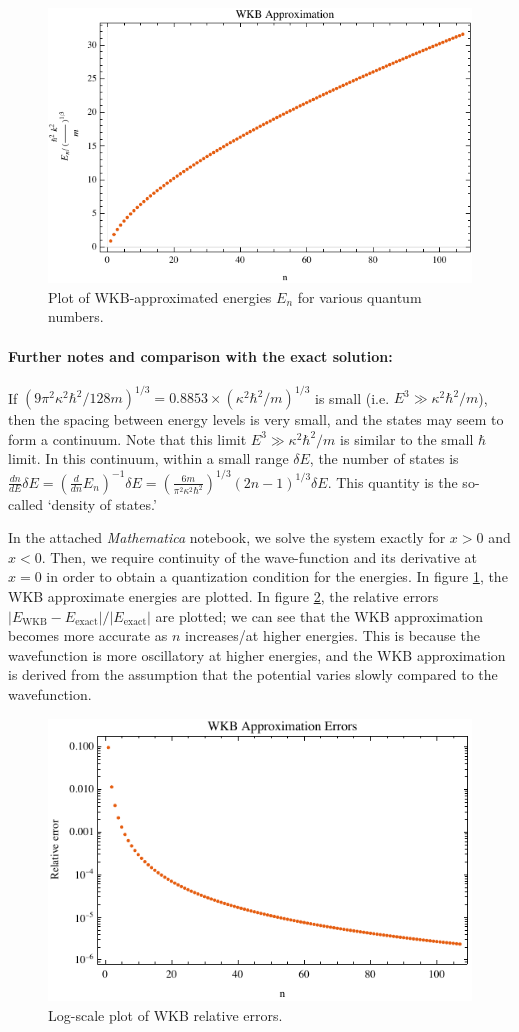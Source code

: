 \documentclass[10pt]{article}
\newcommand{\1}{\mathbf 1}
\begin{document}
\begin{figure}[h!]
	\centering
	\includegraphics[width=0.7\linewidth]{fig/WKBenergies.pdf}
	\caption{\label{WKBenergies}
		Plot of WKB-approximated energies $E_n$ for various quantum numbers.
	}
\end{figure}

\paragraph{Further notes and comparison with the exact solution:}

If $\left(9 \pi^2 \kappa^2 \hbar^2 / 128m\right)^{1/3} = 0.8853 \times (\kappa^2 \hbar^2 / m)^{1/3}$ is small (i.e. $E^3 \gg \kappa^2 \hbar^2 / m$), then the spacing between energy levels is very small, and the states may seem to form a continuum.
Note that this limit $E^3 \gg \kappa^2 \hbar^2 / m$ is similar to the small $\hbar$ limit.
In this continuum, within a small range $\delta E$, the number of states is $\frac{dn}{dE}\delta E = 
(\frac{d}{dn} E_n)^{-1} \delta E = 
\left(
	\frac{6m}{\pi^2\kappa^2 \hbar^2}
\right)^{1/3} (2n-1)^{1/3}
\delta E
$.
This quantity is the so-called `density of states.'

In the attached {\em Mathematica} notebook, we solve the system exactly for $x>0$ and $x<0$.
Then, we require continuity of the wave-function and its derivative at $x = 0$ in order to obtain a quantization condition for the energies.
In figure \ref{WKBenergies}, the WKB approximate energies are plotted.
In figure \ref{WKBerrors}, the relative errors $|E_\text{WKB} - E_\text{exact}|/|E_\text{exact}|$ are plotted; we can see that the WKB approximation becomes more accurate as $n$ increases/at higher energies.
This is because the wavefunction is more oscillatory at higher energies, and the WKB approximation is derived from the assumption that the potential varies slowly compared to the wavefunction.

\begin{figure}
	\centering
	\includegraphics[width=0.7\linewidth]{fig/WKBerrors.pdf}
	\caption{
		\label{WKBerrors}
		Log-scale plot of WKB relative errors.
	}
\end{figure}
\end{document}
